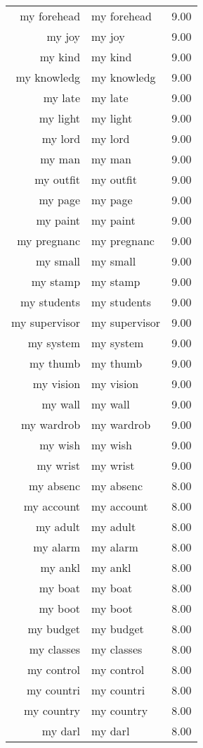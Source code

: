 \begin{table}[ht]
\begin{tabular}{rlr}
  my forehead & my forehead & 9.00 \\ 
  my joy & my joy & 9.00 \\ 
  my kind & my kind & 9.00 \\ 
  my knowledg & my knowledg & 9.00 \\ 
  my late & my late & 9.00 \\ 
  my light & my light & 9.00 \\ 
  my lord & my lord & 9.00 \\ 
  my man & my man & 9.00 \\ 
  my outfit & my outfit & 9.00 \\ 
  my page & my page & 9.00 \\ 
  my paint & my paint & 9.00 \\ 
  my pregnanc & my pregnanc & 9.00 \\ 
  my small & my small & 9.00 \\ 
  my stamp & my stamp & 9.00 \\ 
  my students & my students & 9.00 \\ 
  my supervisor & my supervisor & 9.00 \\ 
  my system & my system & 9.00 \\ 
  my thumb & my thumb & 9.00 \\ 
  my vision & my vision & 9.00 \\ 
  my wall & my wall & 9.00 \\ 
  my wardrob & my wardrob & 9.00 \\ 
  my wish & my wish & 9.00 \\ 
  my wrist & my wrist & 9.00 \\ 
  my absenc & my absenc & 8.00 \\ 
  my account & my account & 8.00 \\ 
  my adult & my adult & 8.00 \\ 
  my alarm & my alarm & 8.00 \\ 
  my ankl & my ankl & 8.00 \\ 
  my boat & my boat & 8.00 \\ 
  my boot & my boot & 8.00 \\ 
  my budget & my budget & 8.00 \\ 
  my classes & my classes & 8.00 \\ 
  my control & my control & 8.00 \\ 
  my countri & my countri & 8.00 \\ 
  my country & my country & 8.00 \\ 
  my darl & my darl & 8.00 \\ 

\end{tabular}
\end{table}
